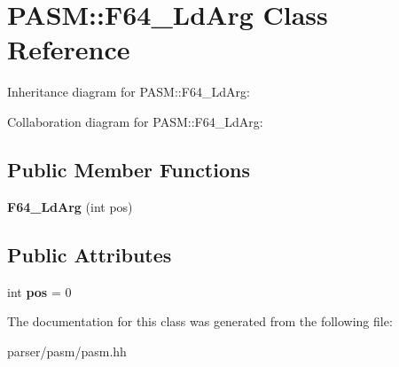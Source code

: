 \hypertarget{classPASM_1_1F64__LdArg}{}\section{P\+A\+SM\+:\+:F64\+\_\+\+Ld\+Arg Class Reference}
\label{classPASM_1_1F64__LdArg}


Inheritance diagram for P\+A\+SM\+:\+:F64\+\_\+\+Ld\+Arg\+:


Collaboration diagram for P\+A\+SM\+:\+:F64\+\_\+\+Ld\+Arg\+:
\subsection*{Public Member Functions}
\begin{DoxyCompactItemize}
\item 
\mbox{\label{classPASM_1_1F64__LdArg_a80f89d6ae7fce4796cafc3ef8b30cb1d}} 
{\bfseries F64\+\_\+\+Ld\+Arg} (int pos)
\end{DoxyCompactItemize}
\subsection*{Public Attributes}
\begin{DoxyCompactItemize}
\item 
\mbox{\label{classPASM_1_1F64__LdArg_ad6b442545b55f3ec36ab8ae2d8adcef7}} 
int {\bfseries pos} = 0
\end{DoxyCompactItemize}


The documentation for this class was generated from the following file\+:\begin{DoxyCompactItemize}
\item 
parser/pasm/pasm.\+hh\end{DoxyCompactItemize}

